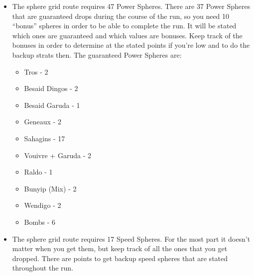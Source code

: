 \begin{itemize}
\item The sphere grid route requires 47 Power Spheres. There are 37 Power Spheres that are guaranteed drops during the course of the run, so you need 10 ``bonus'' spheres in order to be able to complete the run. It will be stated which ones are guaranteed and which values are bonuses. Keep track of the bonuses in order to determine at the stated points if you're low and to do the backup strats then. The guaranteed Power Spheres are:
\begin{itemize}
\item Tros - 2
\item Besaid Dingos - 2
\item Besaid Garuda - 1
\item Geneaux - 2
\item Sahagins - 17
\item Vouivre + Garuda - 2
\item Raldo - 1
\item Bunyip (Mix) - 2
\item Wendigo - 2
\item Bombs - 6
\end{itemize}
\item The sphere grid route requires 17 Speed Spheres. For the most part it doesn't matter when you get them, but keep track of all the ones that you get dropped. There are points to get backup speed spheres that are stated throughout the run.
\end{itemize}

\newpage